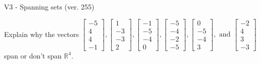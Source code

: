\begin{exercise}
  \begin{exerciseTitle}V3 - Spanning sets (ver. 255)\end{exerciseTitle}
  \begin{exerciseStatement}
    Explain why the vectors \(\left[\begin{array}{r}
-5 \\
4 \\
4 \\
-1
\end{array}\right] , \left[\begin{array}{r}
1 \\
-3 \\
-3 \\
2
\end{array}\right] , \left[\begin{array}{r}
-1 \\
-5 \\
-4 \\
0
\end{array}\right] , \left[\begin{array}{r}
-5 \\
-4 \\
-2 \\
-5
\end{array}\right] , \left[\begin{array}{r}
0 \\
-5 \\
-4 \\
3
\end{array}\right] , \text{ and } \left[\begin{array}{r}
-2 \\
4 \\
3 \\
-3
\end{array}\right]\) span or don't span \(\mathbb{R}^4\). 
	



\end{exerciseStatement}
\end{exercise}

